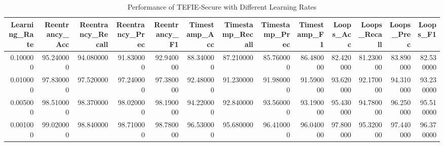 \begin{table}[t]
\centering
\begin{tabular}{rrrrrrrrrrrrr}
\toprule
Learning_Rate & Reentrancy_Acc & Reentrancy_Recall & Reentrancy_Prec & Reentrancy_F1 & Timestamp_Acc & Timestamp_Recall & Timestamp_Prec & Timestamp_F1 & Loops_Acc & Loops_Recall & Loops_Prec & Loops_F1 \\
\midrule
0.100000 & 95.240000 & 94.080000 & 91.830000 & 92.940000 & 88.340000 & 87.210000 & 85.760000 & 86.480000 & 82.420000 & 81.230000 & 83.890000 & 82.530000 \\
0.010000 & 97.830000 & 97.520000 & 97.240000 & 97.380000 & 92.480000 & 91.230000 & 91.980000 & 91.590000 & 93.620000 & 92.170000 & 94.310000 & 93.230000 \\
0.005000 & 98.510000 & 98.370000 & 98.020000 & 98.190000 & 94.220000 & 92.840000 & 93.560000 & 93.190000 & 95.430000 & 94.780000 & 96.250000 & 95.510000 \\
0.001000 & 99.020000 & 98.840000 & 98.710000 & 98.780000 & 96.530000 & 95.680000 & 96.410000 & 96.040000 & 97.800000 & 95.320000 & 97.440000 & 96.370000 \\
\bottomrule
\end{tabular}
\caption{Performance of TEFIE-Secure with Different Learning Rates}
\label{tab:lr}
\end{table}
